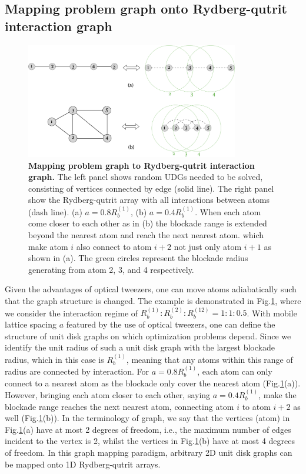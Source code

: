 \documentclass[%
 reprint,
nofootinbib,
 amsmath,amssymb,
 aps,
floatfix,
]{revtex4-2}
\begin{document}
\subsection{Mapping problem graph onto Rydberg-qutrit interaction graph}
\begin{figure}[ht!]
    \centering
    \includegraphics[width=9.3cm]{picture/graph_mapping.png}
    \caption{\textbf{Mapping problem graph to Rydberg-qutrit interaction graph.} The left panel shows random UDGs needed to be solved, consisting of vertices connected by edge (solid line). The right panel show the Rydberg-qutrit array with all interactions between atoms (dash line). (a) $a = 0.8R^{(1)}_b$,  (b) $a=0.4R^{(1)}_b$. When each atom come closer to each other as in (b) the blockade range is extended beyond the nearest atom and reach the next nearest atom. which make atom $i$ also connect to atom $i+2$ not just only atom $i+1$ as shown in (a). The green circles represent the blockade radius generating from atom 2, 3, and 4 respectively.}
    \label{fig:graph_mapping}
\end{figure}
Given the advantages of optical tweezers, one can move atoms adiabatically such that the graph structure is changed. The example is demonstrated in Fig.\ref{fig:graph_mapping}, where we consider the interaction regime of $R^{(1)}_b:R^{(2)}_b:R^{(12)}_b=1:1:0.5$. With mobile lattice spacing $a$ featured by the use of optical tweezers, one can define the structure of unit disk graphs on which optimization problems depend. Since we identify the unit radius of such a unit disk graph with the largest blockade radius, which in this case is $R^{(1)}_b$, meaning that any atoms within this range of radius are connected by interaction. For $a = 0.8R^{(1)}_b$, each atom can only connect to a nearest atom as the blockade only cover the nearest atom (Fig.\ref{fig:graph_mapping}(a)). However, bringing each atom closer to each other, saying $a = 0.4R^{(1)}_b$, make the blockade range reaches the next nearest atom, connecting atom $i$ to atom $i+2$ as well (Fig.\ref{fig:graph_mapping}(b)). In the terminology of graph, we say that the vertices (atom) in Fig.\ref{fig:graph_mapping}(a) have at most 2 degrees of freedom, i.e., the maximum number of edges incident to the vertex is 2, whilst the vertices in Fig.\ref{fig:graph_mapping}(b) have at most 4 degrees of freedom. In this graph mapping paradigm, arbitrary 2D unit disk graphs can be mapped onto 1D Rydberg-qutrit arrays. 
\end{document}
